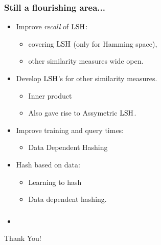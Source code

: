 \documentclass{beamer}
\begin{document}
\begin{frame}
\frametitle{Still a flourishing area...}
\begin{itemize}
\item Improve \textit{recall} of $\mathrm{LSH}$: 
\begin{itemize}
\item covering $\mathrm{LSH}$ (only for Hamming space),
\item other similarity measures wide open.
\end{itemize} 
\item Develop $\mathrm{LSH}$'s for other similarity measures.
\begin{itemize}
\item Inner product 
\item Also gave rise to Assymetric $\mathrm{LSH}$.
\end{itemize}
\item Improve training and query times:
\begin{itemize}
\item Data Dependent Hashing
\end{itemize}
\item Hash based on data:
\begin{itemize}
\item Learning to hash
\item Data dependent hashing.
\end{itemize}
\end{itemize}
\end{frame}

\begin{frame}
\frametitle{}
\begin{itemize}
\item 
\end{itemize}
\end{frame}

\begin{frame}
\begin{center}
Thank You!
\end{center}
\end{frame}
\end{document}
